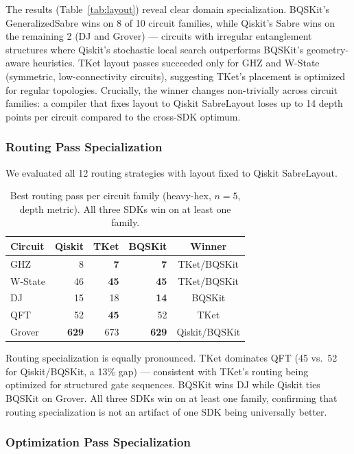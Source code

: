 \documentclass[conference]{IEEEtran}
\begin{document}
The results (Table~\ref{tab:layout}) reveal clear domain specialization.
BQSKit's GeneralizedSabre wins on 8 of 10 circuit families, while Qiskit's Sabre wins on the remaining 2 (DJ and Grover) — circuits with irregular entanglement structures where Qiskit's stochastic local search outperforms BQSKit's geometry-aware heuristics.
TKet layout passes succeeded only for GHZ and W-State (symmetric, low-connectivity circuits), suggesting TKet's placement is optimized for regular topologies.
Crucially, the winner changes non-trivially across circuit families: a compiler that fixes layout to Qiskit SabreLayout loses up to 14 depth points per circuit compared to the cross-SDK optimum.

\subsubsection{Routing Pass Specialization}

We evaluated all 12 routing strategies with layout fixed to Qiskit SabreLayout.

\begin{table}[t]
\centering
\caption{Best routing pass per circuit family (heavy-hex, $n=5$, depth metric). All three SDKs win on at least one family.}
\label{tab:routing}
\begin{tabular}{lrrrc}
\toprule
\textbf{Circuit} & \textbf{Qiskit} & \textbf{TKet} & \textbf{BQSKit} & \textbf{Winner} \\
\midrule
GHZ     &  8 &  \textbf{7} &  \textbf{7} & TKet/BQSKit \\
W-State & 46 & \textbf{45} & \textbf{45} & TKet/BQSKit \\
DJ      & 15 & 18 & \textbf{14} & BQSKit \\
QFT     & 52 & \textbf{45} & 52 & TKet \\
Grover  & \textbf{629} & 673 & \textbf{629} & Qiskit/BQSKit \\
\bottomrule
\end{tabular}
\end{table}

Routing specialization is equally pronounced.
TKet dominates QFT (45 vs.\ 52 for Qiskit/BQSKit, a 13\% gap) — consistent with TKet's routing being optimized for structured gate sequences.
BQSKit wins DJ while Qiskit ties BQSKit on Grover.
All three SDKs win on at least one family, confirming that routing specialization is not an artifact of one SDK being universally better.

\subsubsection{Optimization Pass Specialization}
\end{document}
